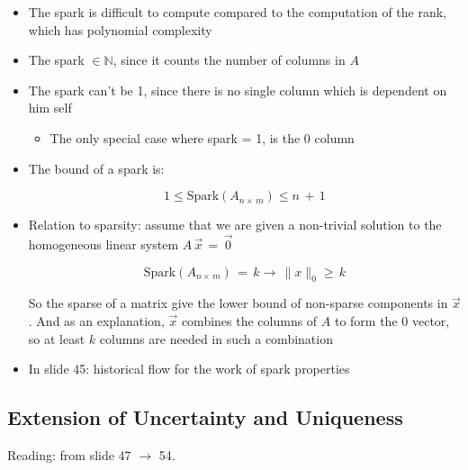 \documentclass[12pt,a4paper]{book}
\begin{document}
\begin{itemize}
    \item The spark is difficult to compute compared to the computation of the rank, which has polynomial complexity
    
    \item The spark $\in \mathbb{N}$, since it counts the number of columns in $A$
    
    \item The spark can't be 1, since there is no single column which is dependent on him self
    
        \begin{itemize}
            \item The only special case where spark = 1, is the 0 column
        \end{itemize}
    
    \item The bound of a spark is:
    
    \begin{equation}
        1 \leq \text{Spark}(A_{n \times \, m}) \leq n \, + \, 1
    \end{equation}
    
    \item Relation to sparsity: assume that we are given a non-trivial solution to the homogeneous linear system $A \, \Vec{x} \, = \, \Vec{0}$
    
    \begin{equation}
        \text{Spark}(A_{n \times \, m}) \, = \, k \rightarrow \, \lVert x \rVert_0 \geq \, k
    \end{equation}
    
    So the sparse of a matrix give the lower bound of non-sparse components in $\Vec{x}$. And as an explanation, $\Vec{x}$ combines the columns of $A$ to form the 0 vector, so at least $k$ columns are needed in such a combination
    
    \item In slide 45: historical flow for the work of spark properties
    
\end{itemize}

\subsection{Extension of Uncertainty and Uniqueness}

Reading: from slide 47 $\rightarrow$ 54.\\
\end{document}
